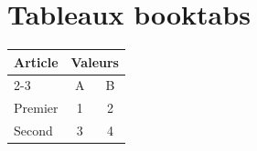 \documentclass{article}
\begin{document}
\hsize=380pt
\section{Tableaux booktabs}
\begin{tabular}{lcc}
\toprule
Article & \multicolumn{2}{c}{Valeurs} \\
\cmidrule(lr){2-3}
 & A & B \\
\midrule
Premier & 1 & 2 \\
Second & 3 & 4 \\
\bottomrule
\end{tabular}
\end{document}
